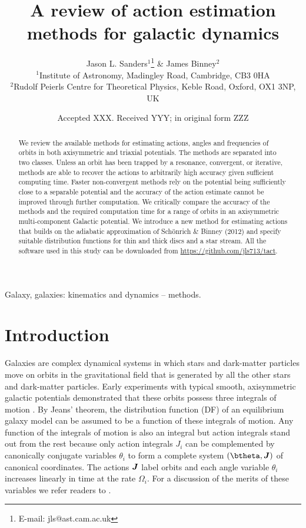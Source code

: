 \documentclass[useAMS,usenatbib,fleqn,a4paper]{mn2e}
\title{A review of action estimation methods for galactic dynamics}
\author[J. L. Sanders \& J. Binney]{Jason L. Sanders$^1$\thanks{E-mail: jls@ast.cam.ac.uk} \& James Binney$^2$\\
$^1$Institute of Astronomy, Madingley Road, Cambridge, CB3 0HA\\
$^2$Rudolf Peierls Centre for Theoretical Physics, Keble Road, Oxford, OX1 3NP, UK}
\date{Accepted XXX. Received YYY; in original form ZZZ}
\newcommand{\bs}[1]{\bmath{#1}}
\begin{document}
\label{firstpage}
\pagerange{\pageref{firstpage}--\pageref{lastpage}} 
\maketitle
\begin{abstract}
We review the available methods for estimating actions, angles and
frequencies of orbits in both axisymmetric and triaxial potentials. The
methods are separated into two classes. Unless an orbit has been trapped by a
resonance, convergent, or iterative, methods are able to recover the actions
to arbitrarily high accuracy given sufficient computing time.  Faster
non-convergent methods rely on the potential being sufficiently close to a
separable potential and the accuracy of the action estimate cannot be
improved through further computation.  We critically compare the accuracy of
the methods and the required computation time for a range of orbits in an
axisymmetric multi-component Galactic potential.  We introduce a new method
for estimating actions that builds on the adiabatic approximation of
Sch\"onrich \& Binney (2012) and specify suitable distribution functions for
thin and thick discs and a star stream. All the software used in this study
can be downloaded from
\href{https://github.com/jls713/tact}{https://github.com/jls713/tact}.
\end{abstract}

\begin{keywords}
Galaxy, galaxies: kinematics and dynamics -- methods.
\end{keywords}

\section{Introduction}
 
Galaxies are complex dynamical systems in which stars and dark-matter
particles move on orbits in the gravitational field that is generated by all
the other stars and dark-matter particles. Early experiments with typical
smooth, axisymmetric galactic potentials demonstrated that these orbits
possess three integrals of motion \citep{Ollongren1962}. By Jeans' theorem,
the distribution function (DF) of an equilibrium galaxy model can be assumed to be
a function of these integrals of motion.  Any function of the integrals of
motion is also an integral but action integrals stand out from the rest
because only action integrals $J_i$ can be complemented by canonically
conjugate variables $\theta_i$ to form a complete system $(\btheta,\bs{J})$ of
canonical coordinates. The actions $\bs{J}$ label orbits and each angle
variable $\theta_i$ increases linearly in time at the rate $\Omega_i$.  For a
discussion of the merits of these variables we refer readers to
\cite{BinneyTremaine}.
\end{document}
